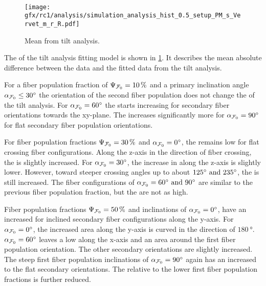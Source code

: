 \paragraph{\rvalue{}}
% 
\begin{figure}[!p]
\centering
\texttt{[image: gfx/rc1/analysis/simulation\_analysis\_hist\_0.5\_setup\_PM\_s\_Vervet\_m\_r\_R.pdf]}
\caption{Mean \rvalue{} from tilt analysis. }
\label{fig:sim_ana_rvalue}
\end{figure}
% 
The \rvalue{} of the tilt analysis fitting model is shown in \cref{fig:sim_ana_rvalue}.
It describes the mean absolute difference between the data and the fitted data from the tilt analysis.
\par
%
For a fiber population fraction of $\textnormal{$\Psi_{\textnormal{$\mathcal{F}_0$}}$}=\SI{10}{\percent}$ and a primary inclination angle $\textnormal{$\alpha_{\textnormal{$\mathcal{F}_0$}}$}\leq\SI{30}{\degree}$ the orientation of the second fiber population does not change the \rvalue{} of the tilt analysis.
For $\textnormal{$\alpha_{\textnormal{$\mathcal{F}_0$}}$}=\SI{60}{\degree}$ the \rvalue{} starts increasing for secondary fiber orientations towards the xy-plane.
The \rvalue{} increases significantly more for $\textnormal{$\alpha_{\textnormal{$\mathcal{F}_0$}}$}=\SI{90}{\degree}$ for flat secondary fiber population orientations.
\par
% 
For fiber population fractions $\textnormal{$\Psi_{\textnormal{$\mathcal{F}_0$}}$}=\SI{30}{\percent}$ and $\textnormal{$\alpha_{\textnormal{$\mathcal{F}_0$}}$}=\SI{0}{\degree}$, the \rvalue{} remains low for flat crossing fiber configurations.
Along the z-axis in the direction of fiber crossing, the \rvalue{} is slightly increased.
For $\textnormal{$\alpha_{\textnormal{$\mathcal{F}_0$}}$}=\SI{30}{\degree}$, the increase in \rvalue{} along the z-axis is slightly lower.
However, toward steeper crossing angles up to about $\SIlist{125;235}{\degree}$, the \rvalue{} is still increased.
The fiber configurations of $\modelInc=\SIlist{60;90}{\degree}$ are similar to the previous fiber population fraction, but the \rvalue{} are not as high.
\par
%
Fiber population fractions $\textnormal{$\Psi_{\textnormal{$\mathcal{F}_0$}}$}=\SI{50}{\percent}$ and inclinations of $\textnormal{$\alpha_{\textnormal{$\mathcal{F}_0$}}$}=\SI{0}{\degree}$, have an increased \rvalue{} for inclined secondary fiber configurations along the y-axis.
For $\textnormal{$\alpha_{\textnormal{$\mathcal{F}_0$}}$}=\SI{0}{\degree}$, the increased area along the y-axis is curved in the direction of $\SI{180}{\degree}$.
$\textnormal{$\alpha_{\textnormal{$\mathcal{F}_0$}}$}=\SI{60}{\degree}$ leaves a low \rvalue{} along the x-axis and an area around the first fiber population orientation.
The other secondary orientations are slightly increased.
The steep first fiber population inclinations of $\textnormal{$\alpha_{\textnormal{$\mathcal{F}_0$}}$}=\SI{90}{\degree}$ again has an increased \rvalue{} to the flat secondary orientations.
The \rvalue{} relative to the lower first fiber population fractions is further reduced.
